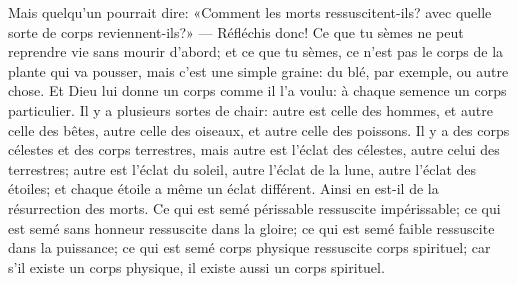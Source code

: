 Mais quelqu’un pourrait dire:
	«Comment les morts ressuscitent-ils?
	avec quelle sorte de corps reviennent-ils?»
--- Réfléchis donc! Ce que tu sèmes ne peut reprendre vie sans mourir d’abord;
	et ce que tu sèmes, ce n’est pas le corps de la plante qui va pousser,
	mais c’est une simple graine: du blé, par exemple, ou autre chose.
Et Dieu lui donne un corps comme il l’a voulu:
	à chaque semence un corps particulier.
Il y a plusieurs sortes de chair:
	autre est celle des hommes, et autre celle des bêtes,
	autre celle des oiseaux, et autre celle des poissons.
Il y a des corps célestes et des corps terrestres,
	mais autre est l’éclat des célestes, autre celui des terrestres;
	autre est l’éclat du soleil, autre l’éclat de la lune,
		autre l’éclat des étoiles;
	et chaque étoile a même un éclat différent.
Ainsi en est-il de la résurrection des morts.
Ce qui est semé périssable ressuscite impérissable;
	ce qui est semé sans honneur ressuscite dans la gloire;
	ce qui est semé faible ressuscite dans la puissance;
	ce qui est semé corps physique ressuscite corps spirituel;
	car s’il existe un corps physique, il existe aussi un corps spirituel.
